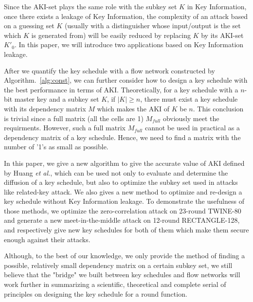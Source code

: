 \begin{bigabstract}
Since the AKI-set plays the same role with the subkey set $K$ in Key Information, once there exists a leakage of Key Information, the complexity of an attack based on a guessing set $K$ (usually with a distinguisher whose input/output is the set which $K$ is generated from) will be easily reduced by replacing $K$ by its AKI-set $K'_0$.
In this paper, we will introduce two applications based on Key Information leakage.

After we quantify the key schedule with a flow network constructed by Algorithm.~\ref{alg:const}, we can further consider how to design a key schedule with the best performance in terms of AKI.
Theoretically, for a key schedule with a $n$-bit master key and a subkey set $K$, if $|K|\geq n$, there must exist a key schedule with its dependency matrix $M$ which makes the AKI of $K$ be $n$.
This conclusion is trivial since a full matrix (all the cells are 1) $M_{full}$ obviously meet the requirments.
However, such a full matrix $M_{full}$ cannot be used in practical as a dependency matrix of a key schedule.
Hence, we need to find a matrix with the number of '1's as small as possible.

In this paper, we give a new algorithm to give the accurate value of AKI defined by Huang \emph{et al.}, which can be used not only to evaluate and determine the diffusion of a key schedule, but also to optimize the subkey set used in attacks like related-key attack.
We also gives a new method to optimize and re-design a key schedule without Key Information leakage.
To demonstrate the usefulness of those methods, we optimize the zero-correlation attack on 23-round TWINE-80 and generate a new meet-in-the-middle attack on 12-round RECTANGLE-128,
and respectively give new key schedules for both of them which make them secure enough against their attacks.

Although, to the best of our knowledge, we only provide the method of finding a possible, relatively small dependency matrix on a certain subkey set,
we still believe that the "bridge" we built between key schedules and flow networks will work further in summarizing a scientific, theoretical and complete serial of principles on designing the key schedule for a round function.

\end{bigabstract}
